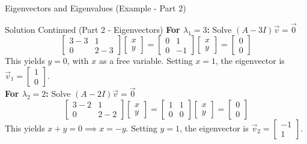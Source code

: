 \documentclass[10pt, aspectratio=169]{beamer}
\begin{document}
\begin{frame}{Eigenvectors and Eigenvalues (Example - Part 2)}
    \begin{exampleblock}{Solution Continued (Part 2 - Eigenvectors)}
        \textbf{For $\lambda_1 = 3$:} Solve $(A - 3I)\vec{v} = \vec{0}$
        $$\begin{bmatrix} 3-3 & 1 \\ 0 & 2-3 \end{bmatrix} \begin{bmatrix} x \\ y \end{bmatrix} = \begin{bmatrix} 0 & 1 \\ 0 & -1 \end{bmatrix} \begin{bmatrix} x \\ y \end{bmatrix} = \begin{bmatrix} 0 \\ 0 \end{bmatrix}$$
        This yields $y = 0$, with $x$ as a free variable. Setting $x = 1$, the eigenvector is $\vec{v}_1 = \begin{bmatrix} 1 \\ 0 \end{bmatrix}$. \\
        \vspace{0.2cm}
        \textbf{For $\lambda_2 = 2$:} Solve $(A - 2I)\vec{v} = \vec{0}$
        $$\begin{bmatrix} 3-2 & 1 \\ 0 & 2-2 \end{bmatrix} \begin{bmatrix} x \\ y \end{bmatrix} = \begin{bmatrix} 1 & 1 \\ 0 & 0 \end{bmatrix} \begin{bmatrix} x \\ y \end{bmatrix} = \begin{bmatrix} 0 \\ 0 \end{bmatrix}$$
        This yields $x + y = 0 \implies x = -y$. Setting $y = 1$, the eigenvector is $\vec{v}_2 = \begin{bmatrix} -1 \\ 1 \end{bmatrix}$.
    \end{exampleblock}
\end{frame}
\end{document}
